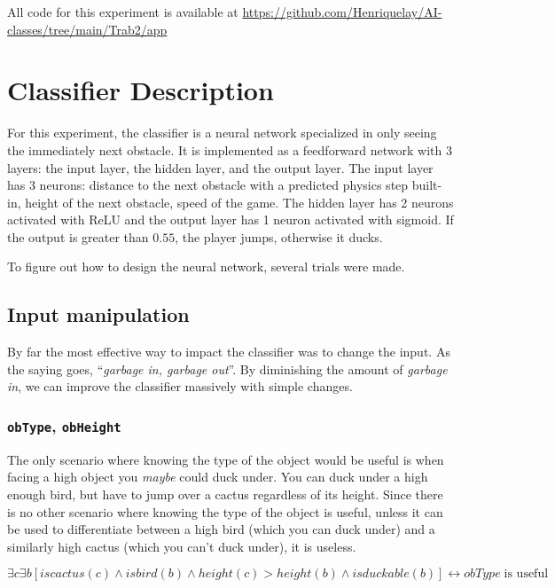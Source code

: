 \documentclass[review]{elsarticle}
\begin{document}
All code for this experiment is available at \url{https://github.com/Henriquelay/AI-classes/tree/main/Trab2/app}

\section{Classifier Description}

For this experiment, the classifier is a neural network specialized in only seeing the immediately next obstacle. It is implemented as a feedforward network with 3 layers: the input layer, the hidden layer, and the output layer. The input layer has 3 neurons: distance to the next obstacle with a predicted physics step built-in, height of the next obstacle, speed of the game. The hidden layer has 2 neurons activated with ReLU and the output layer has 1 neuron activated with sigmoid. If the output is greater than $0.55$, the player jumps, otherwise it ducks.

To figure out how to design the neural network, several trials were made.

\subsection{Input manipulation}

By far the most effective way to impact the classifier was to change the input. As the saying goes, ``\textit{garbage in, garbage out}''. By diminishing the amount of \textit{garbage in}, we can improve the classifier massively with simple changes.

\subsubsection{\texttt{obType}, \texttt{obHeight}}

The only scenario where knowing the type of the object would be useful is when facing a high object you \textit{maybe} could duck under. You can duck under a high enough bird, but have to jump over a cactus regardless of its height. Since there is no other scenario where knowing the type of the object is useful, unless it can be used to differentiate between a high bird (which you can duck under) and a similarly high cactus (which you can't duck under), it is useless.

$$\exists c \exists b [iscactus(c) \land isbird(b) \land height(c) > height(b) \land isduckable(b)] \leftrightarrow obType \; \text{is useful}$$ \label{eq:obType}
\end{document}
